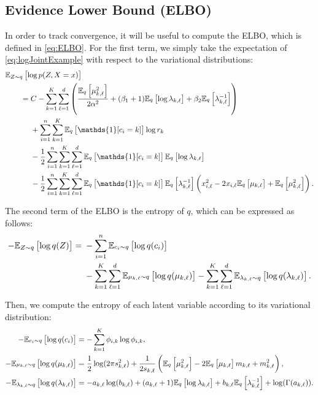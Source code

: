 \documentclass[11pt]{article}
\begin{document}
\subsection{Evidence Lower Bound (ELBO)}

In order to track convergence, it will be useful to compute the ELBO, which is defined in \eqref{eq:ELBO}.
For the first term, we simply take the expectation of \eqref{eq:logJointExample} with respect to the variational distributions:
\begin{align}
\MoveEqLeft \nonumber
\expectOver{Z \sim q}{\log p(Z, X = x)} \\
&= \begin{aligned}[t]
    & C - \sum_{k=1}^K \sum_{\ell=1}^d \left( \frac{\expectOver{q}{\mu_{k, \ell}^2}}{2\alpha^2} + (\beta_1 + 1) \expectOver{q}{\log \lambda_{k,\ell}} + \beta_2 \expectOver{q}{\lambda_{k,\ell}^{-1}} \right) \\
    & + \sum_{i=1}^n \sum_{k=1}^K \expectOver{q}{\mathds{1}[c_i = k]} \log r_k \\
    & - \frac{1}{2} \sum_{i=1}^n \sum_{k=1}^K \sum_{\ell=1}^d \expectOver{q}{\mathds{1}[c_i = k]} \expectOver{q}{\log \lambda_{k,\ell}} \\
    & - \frac{1}{2} \sum_{i=1}^n \sum_{k=1}^K \sum_{\ell=1}^d \expectOver{q}{\mathds{1}[c_i = k]} \expectOver{q}{\lambda_{k,\ell}^{-1}} \left( x_{i,\ell}^2 - 2 x_{i,\ell} \expectOver{q}{\mu_{k,\ell}} + \expectOver{q}{\mu_{k,\ell}^2} \right).
    \end{aligned}
\end{align}

The second term of the ELBO is the entropy of $q$, which can be expressed as follows:
\begin{align}
-\mathbb{E}_{\substack{Z \sim q}}\left[ \log q(Z) \right]
={}& -\sum_{i=1}^n \mathbb{E}_{\substack{c_i \sim q}}\left[ \log q(c_i) \right] \\ \nonumber
   & -\sum_{k=1}^K \sum_{\ell=1}^d \mathbb{E}_{\substack{\mu_{k,\ell} \sim q}}\left[ \log q(\mu_{k,\ell}) \right]
     -\sum_{k=1}^K \sum_{\ell=1}^d \mathbb{E}_{\substack{\lambda_{k,\ell} \sim q}}\left[ \log q(\lambda_{k,\ell}) \right].
\end{align}

Then, we compute the entropy of each latent variable according to its variational distribution:
\begin{align}
-\mathbb{E}_{\substack{c_i \sim q}}\left[ \log q(c_i) \right]
&= -\sum_{k=1}^K \phi_{i,k} \log \phi_{i,k}, \\
-\mathbb{E}_{\substack{\mu_{k,\ell} \sim q}}\left[ \log q(\mu_{k,\ell}) \right]
&= \frac{1}{2} \log(2 \pi s_{k,\ell}^2) + \frac{1}{2 s_{k,\ell}} \left( \mathbb{E}_{\substack{q}}\left[ \mu_{k,\ell}^2 \right] - 2 \mathbb{E}_{\substack{q}}\left[ \mu_{k,\ell} \right] m_{k,\ell} + m_{k,\ell}^2 \right), \\
-\mathbb{E}_{\substack{\lambda_{k,\ell} \sim q}}\left[ \log q(\lambda_{k,\ell}) \right]
&= -a_{k,\ell} \log(b_{k,\ell}) + (a_{k,\ell} + 1) \mathbb{E}_{\substack{q}}\left[ \log \lambda_{k,\ell} \right] + b_{k,\ell} \mathbb{E}_{\substack{q}}\left[ \lambda_{k,\ell}^{-1} \right] + \log(\Gamma(a_{k,\ell})).
\end{align}
\end{document}
